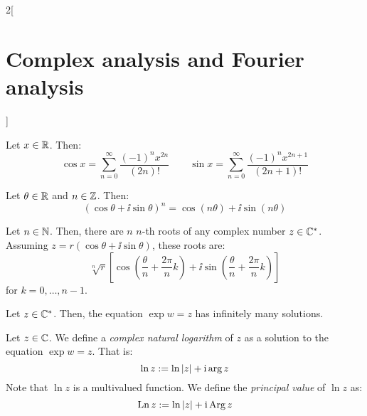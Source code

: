 \documentclass[../../../main.tex]{subfiles}
\begin{document}
\begin{multicols}{2}[\section{Complex analysis and Fourier analysis}]
\begin{corollary}
  \end{corollary}
  \begin{corollary}
    Let $x\in\mathbb{R}$. Then: $$\cos x=\sum_{n=0}^\infty\frac{(-1)^nx^{2n}}{(2n)!}\qquad\sin x=\sum_{n=0}^\infty\frac{(-1)^nx^{2n+1}}{(2n+1)!}$$
  \end{corollary}
  \begin{proposition}
    Let $\theta\in\mathbb{R}$ and $n\in\mathbb{Z}$. Then: $${(\cos{\theta} + \ii\sin{\theta})}^n = \cos(n\theta) + \ii\sin(n\theta)$$
  \end{proposition}
  \begin{theorem}
    Let $n\in\mathbb{N}$. Then, there are $n$ $n$-th roots of any complex number $z\in \mathbb{C}^*$. Assuming $z=r(\cos\theta + \ii\sin\theta)$, these roots are: $$\sqrt[n]{r}\left[\cos\left(\frac{\theta}{n}+\frac{2\pi}{n}k\right)+\ii\sin\left(\frac{\theta}{n}+\frac{2\pi}{n}k\right)\right]$$ for $k=0,\ldots,n-1$.
  \end{theorem}
  \begin{proposition}
    Let $z\in\mathbb{C}^*$. Then, the equation $\exp{w}=z$ has infinitely many solutions.
  \end{proposition}
  \begin{definition}
    Let $z\in \mathbb{C}$. We define a \emph{complex natural logarithm} of $z$ as a solution to the equation $\exp{w}=z$. That is: $$\ln z:=\ln \abs{z}+\mathrm{i}\arg z$$ Note that $\ln z$ is a multivalued function.
    We define the \emph{principal value} of $\ln z$ as: $$\operatorname{Ln} z:=\ln \abs{z}+\mathrm{i}\operatorname{Arg} z$$
  \end{definition}

\end{multicols}
\end{document}
